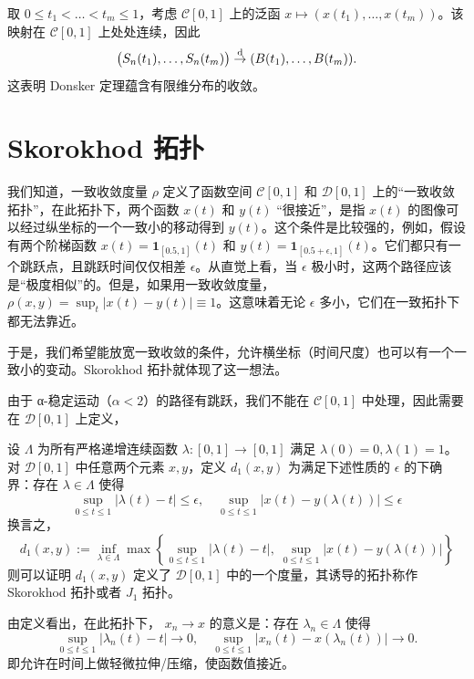 \begin{example}[有限维分布]
取 $0\le t_1<\dots<t_m\le 1$，考虑 $\mathcal C[0,1]$ 上的泛函 $x\mapsto (x(t_1),\dots,x(t_m))$。该映射在 $\mathcal C[0,1]$ 上处处连续，因此
\[\bigl( S_n(t_1),\dots,S_n(t_m) \bigr) \overset{\rm d}\to (B(t_1),\dots,B(t_m)).\]
这表明 Donsker 定理蕴含有限维分布的收敛。

\end{example}

\section{Skorokhod 拓扑}

我们知道，一致收敛度量 $\rho$ 定义了函数空间 $\mathcal C[0,1]$ 和 $\mathcal D[0,1]$ 上的``一致收敛拓扑''，在此拓扑下，两个函数 $x(t)$ 和 $y(t)$ ``很接近''，是指 $x(t)$ 的图像可以经过纵坐标的一个一致小的移动得到 $y(t)$。这个条件是比较强的，例如，假设有两个阶梯函数 $x(t) = \mathbf{1}_{[0.5, 1]}(t)$ 和 $y(t) = \mathbf{1}_{[0.5+\epsilon, 1]}(t)$。它们都只有一个跳跃点，且跳跃时间仅仅相差 $\epsilon$。从直觉上看，当 $\epsilon$ 极小时，这两个路径应该是``极度相似''的。但是，如果用一致收敛度量，$\rho(x,y) = \sup_t |x(t)-y(t)| \equiv 1$。这意味着无论 $\epsilon$ 多小，它们在一致拓扑下都无法靠近。

于是，我们希望能放宽一致收敛的条件，允许横坐标（时间尺度）也可以有一个一致小的变动。Skorokhod 拓扑就体现了这一想法。

由于 α-稳定运动（$\alpha<2$）的路径有跳跃，我们不能在 $\mathcal{C}[0,1]$ 中处理，因此需要在 $\mathcal D[0,1]$ 上定义，

\begin{definition*}[Skorokhod $J_1$ 度量]
设 $\Lambda$ 为所有严格递增连续函数 $\lambda:[0,1]\to[0,1]$ 满足 $\lambda(0)=0,\lambda(1)=1$。对 $\mathcal D[0,1]$ 中任意两个元素 $x,y$，定义 $d_1(x,y)$ 为满足下述性质的 $\epsilon$ 的下确界：存在 $\lambda \in \Lambda$ 使得
\[\sup_{0\le t\le 1}|\lambda(t)-t|\le\epsilon,\quad \sup_{0\le t\le 1}|x(t)-y(\lambda(t))|\le\epsilon\]
换言之，
\[d_1(x,y):= \inf_{\lambda\in\Lambda} \max\left\{ \sup_{0\le t\le 1} |\lambda(t)-t|,\; \sup_{0\le t\le 1} |x(t)-y(\lambda(t))| \right\}\]
则可以证明 $d_1(x,y)$ 定义了 $\mathcal D[0,1]$ 中的一个度量，其诱导的拓扑称作 Skorokhod 拓扑或者 $J_1$ 拓扑。
\end{definition*}

由定义看出，在此拓扑下， $x_n \to x$ 的意义是：存在 $\lambda_n \in \Lambda$ 使得
\[\sup_{0\le t\le 1} |\lambda_n(t)-t| \to 0, \quad \sup_{0\le t\le 1} |x_n(t) - x(\lambda_n(t))| \to 0.\]
即允许在时间上做轻微拉伸/压缩，使函数值接近。

